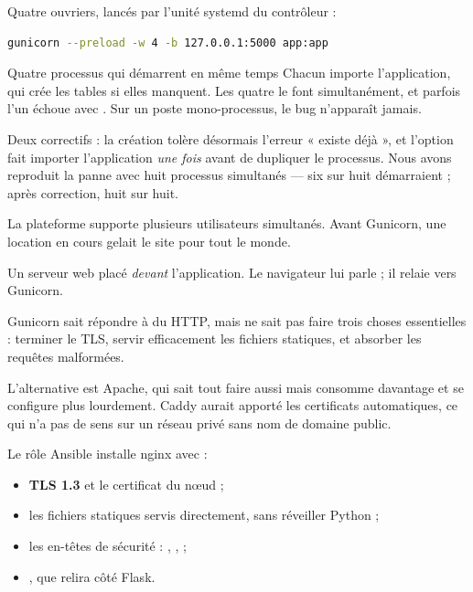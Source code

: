 \role
Quatre ouvriers, lancés par l'unité systemd du contrôleur :

\begin{lstlisting}[language=bash]
gunicorn --preload -w 4 -b 127.0.0.1:5000 app:app
\end{lstlisting}

\begin{piege}{Quatre processus qui démarrent en même temps}
Chacun importe l'application, qui crée les tables si elles manquent. Les quatre
le font simultanément, et parfois l'un échoue avec . Sur un poste mono-processus, le bug n'apparaît jamais.

Deux correctifs : la création tolère désormais l'erreur « existe déjà », et
l'option  fait importer l'application \emph{une fois} avant de
dupliquer le processus. Nous avons reproduit la panne avec huit processus
simultanés --- six sur huit démarraient ; après correction, huit sur huit.
\end{piege}

\apport
La plateforme supporte plusieurs utilisateurs simultanés. Avant Gunicorn, une
location en cours gelait le site pour tout le monde.


\quoi
Un serveur web placé \emph{devant} l'application. Le navigateur lui parle ; il
relaie vers Gunicorn.

\pourquoi
Gunicorn sait répondre à du HTTP, mais ne sait pas faire trois choses
essentielles : terminer le TLS, servir efficacement les fichiers statiques, et
absorber les requêtes malformées.

L'alternative est Apache, qui sait tout faire aussi mais consomme davantage et
se configure plus lourdement. Caddy aurait apporté les certificats
automatiques, ce qui n'a pas de sens sur un réseau privé sans nom de domaine
public.

\role
Le rôle Ansible  installe nginx avec :

\begin{itemize}
\item \textbf{TLS 1.3} et le certificat du nœud ;
\item les fichiers statiques servis directement, sans réveiller Python ;
\item les en-têtes de sécurité : ,
  ,  ;
\item {}, que  relira côté Flask.
\end{itemize}

